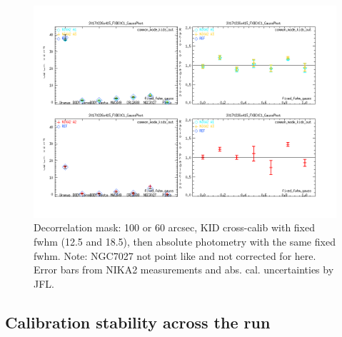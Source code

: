 \documentclass[a4paper, 11pt]{article} %
\begin{document}



\begin{figure}
\begin{center}
\includegraphics[clip, angle=0, scale = 0.4]{Figures/Calibrators_N2R9_20170226s415_FXDC0C1_GaussPhotFluxType_fixed_fwhm_gauss.png}
\caption{Decorrelation mask: 100 or 60 arcsec, KID cross-calib with fixed fwhm
  (12.5 and 18.5), then absolute photometry with the same fixed fwhm. Note:
  NGC7027 not point like and not corrected for here. Error bars from NIKA2
  measurements and abs. cal. uncertainties by JFL.}
\label{fig:fov}
\end{center}
\end{figure}


\subsection{Calibration stability across the run}
\end{document}
